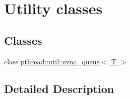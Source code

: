 \hypertarget{group__util}{\section{Utility classes}
\label{group__util}
}
\subsection*{Classes}
\begin{DoxyCompactItemize}
\item 
class \hyperlink{classpthread_1_1util_1_1sync__queue}{pthread\+::util\+::sync\+\_\+queue$<$ T $>$}
\end{DoxyCompactItemize}


\subsection{Detailed Description}
